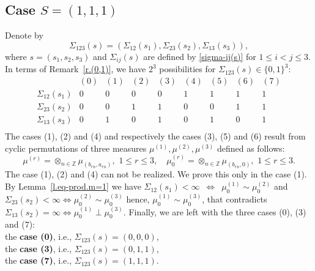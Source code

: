 \documentclass[preprint,12pt]{elsarticle}
\numberwithin{equation}{section}
\begin{document}
\subsection{Case $S=(1,1,1)$}
Denote by 
\begin{equation}
 \label{Sigma[123]}
 \Sigma_{123}(s)=(\Sigma_{12}(s_1), \Sigma_{23}(s_2),\Sigma_{13}(s_3)),
\end{equation}
where  $s=(s_1,s_2,s_3)$ and $\Sigma_{ij}(s)$ are defined by \eqref{sigma-ij(s)} for $1\leq i<j\leq 3$.
In terms of Remark~\ref{r.(0,1)}, we have   $2^3$ possibilities
for $\Sigma_{123}(s)
\in \{0,1\}^3$:
$$
\begin{array}{ccccccccc}
   &(0)&(1)&(2)&(3)&(4)&(5)&(6)&(7)\\
\Sigma_{12}(s_1)&0&0&0&0&1&1&1&1\\
\Sigma_{23}(s_2)&0&0&1&1&0&0&1&1\\
\Sigma_{13}(s_3)&0&1&0&1&0&1&0&1\\
\end{array}
$$
The cases (1), (2) and (4) and respectively the cases (3), (5) and (6) result from cyclic permutations of three  measures $\mu^{(1)},\mu^{(2)},\mu^{(3)}$ defined as follows:
\begin{equation}
\label{mu^(r)}
\mu^{(r)}=\otimes_{n\in \mathbb Z}\mu_{(b_{rn},a_{rn})},\,\,1\leq r\leq 3,\quad
\mu^{(r)}_0=\otimes_{n\in \mathbb Z}\mu_{(b_{rn},0)},\,\,1\leq r\leq 3.
\end{equation}
The case (1), (2) and (4) can not be realized. We prove this only in the case (1). By Lemma~\ref{l.eq-prod.m=1} we have
$\Sigma_{12}(s_1)<\infty \,\,\,
\Leftrightarrow \,\,\,\mu_0^{(1)}\sim \mu_0^{(2)}$ and $\Sigma_{23}(s_2)<\infty \Leftrightarrow \mu_0^{(2)}\sim \mu_0^{(3)}$ hence, $\mu_0^{(1)}\sim \mu_0^{(3)}$, that contradicts $\Sigma_{13}(s_2)=\infty \Leftrightarrow \mu_0^{(1)}\perp\mu_0^{(3)}.$
Finally, we are left with  the three cases
%
(0), (3) and (7):\\
the {\bf case (0)}, i.e., $\Sigma_{123}(s)=(0,0,0)$,\\
the {\bf case (3)}, i.e.,  $\Sigma_{123}(s)=(0,1,1)$,\\
the {\bf case (7)}, i.e., $\Sigma_{123}(s)=(1,1,1)$.
\end{document}
